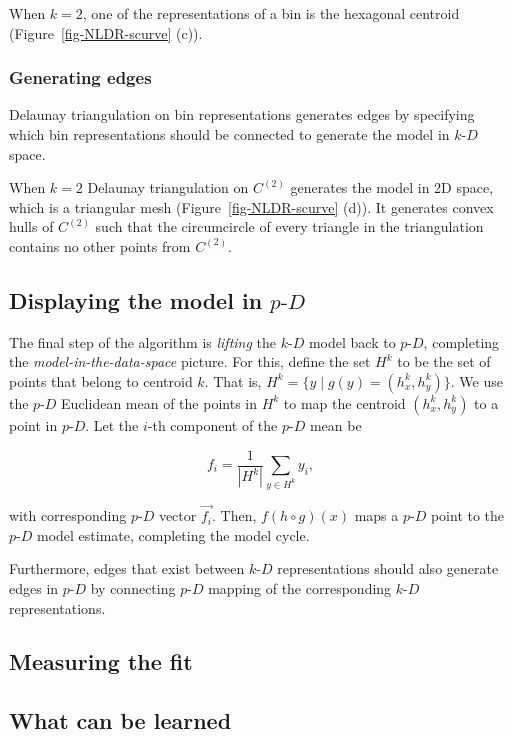 \documentclass[
  12pt]{article}
\newcommand\pD{$p\text{-}D$}
\newcommand\kD{$k\text{-}D$}
\begin{document}
When \(k = 2\), one of the representations of a bin is the hexagonal
centroid (Figure~\ref{fig-NLDR-scurve} (c)).

\subsubsection{Generating edges}\label{generating-edges}

Delaunay triangulation on bin representations generates edges by
specifying which bin representations should be connected to generate the
model in \kD{} space.

When \(k = 2\) Delaunay triangulation on \(C^{(2)}\) generates the model
in 2D space, which is a triangular mesh (Figure~\ref{fig-NLDR-scurve}
(d)). It generates convex hulls of \(C^{(2)}\) such that the
circumcircle of every triangle in the triangulation contains no other
points from \(C^{(2)}\).

\subsection{\texorpdfstring{Displaying the model in
\pD{}}{Displaying the model in }}\label{displaying-the-model-in}

The final step of the algorithm is \emph{lifting} the \kD{} model back
to \pD{}, completing the \emph{model-in-the-data-space} picture. For
this, define the set \(H^k\) to be the set of points that belong to
centroid \(k\). That is, \(H^k = \{ y \; | \; g(y) = (h_x^k, h_y^k)\}\).
We use the \pD{} Euclidean mean of the points in \(H^k\) to map the
centroid \((h_x^k, h_y^k)\) to a point in \pD{}. Let the \(i\)-th
component of the \pD{} mean be

\[f_i = \frac{1}{\left|H^k\right|}\sum_{y \in H^k} y_i,\]

with corresponding \pD{} vector \(\vec{f_i}\). Then, \(f(h\circ g)(x)\)
maps a \pD{} point to the \pD{} model estimate, completing the model
cycle.

Furthermore, edges that exist between \kD{} representations should also
generate edges in \pD{} by connecting \pD{} mapping of the corresponding
\kD{} representations.

\subsection{Measuring the fit}\label{measuring-the-fit}

\subsection{What can be learned}\label{what-can-be-learned}
\end{document}
